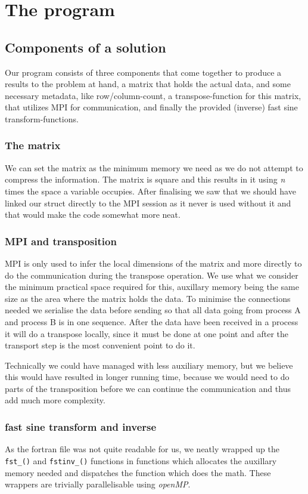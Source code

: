 \section{The program}
\subsection{Components of a solution}
Our program consists of three components that come together to produce a results to
the problem at hand, a matrix that holds the actual data, and some necessary metadata,
like row/column-count, a transpose-function for this matrix, that utilizes MPI for communication,
and finally the provided (inverse) fast sine transform-functions.

\subsubsection{The matrix}
We can set the matrix as the minimum memory we need as we do not attempt to
compress the information. The matrix is square and this results in it using
\emph{n} times the space a variable occupies. After finalising we saw that we
should have linked our struct directly to the MPI session as it never is used
without it and that would make the code somewhat more neat. 

\subsubsection{MPI and transposition}
MPI is only used to infer the local dimensions of the matrix and more directly
to do the communication during the transpose operation. We use what we consider
the minimum practical space required for this, auxillary memory being the same
size as the area where the matrix holds the data. To minimise the connections
needed we serialise the data before sending so that all data going from process
A and process B is in one sequence. After the data have been received in a
process it will do a transpose locally, since it must be done at one point and
after the transport step is the most convenient point to do it. 

Technically we could have managed with less auxiliary memory, but we believe this
would have resulted in longer running time, because we would need to do parts
of the transposition before we can continue the communication and thus add much more
complexity. 

\subsubsection{fast sine transform and inverse }
As the fortran file was not quite readable for us, we neatly wrapped up the
\texttt{fst\_()} and \texttt{fstinv\_()} functions in functions which allocates the
auxillary memory needed and dispatches the function which does the math. These
wrappers are trivially parallelisable using \emph{openMP}. 

